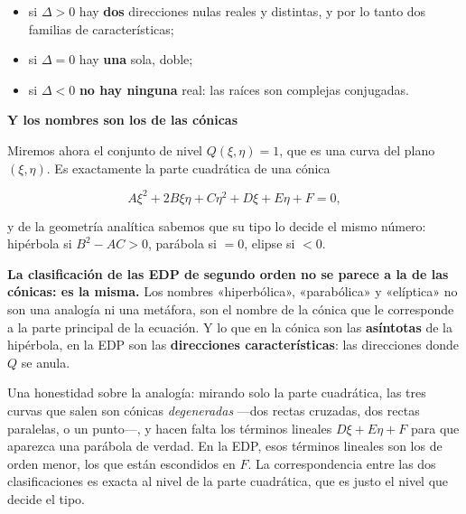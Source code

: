 \documentclass[
  spanish,
  a4paper,
]{scrbook}
\providecommand{\tightlist}{%
  \setlength{\itemsep}{0pt}\setlength{\parskip}{0pt}}
\theoremstyle{definition}
\theoremstyle{plain}
\theoremstyle{definition}
\theoremstyle{plain}
\theoremstyle{definition}
\theoremstyle{remark}
\begin{document}
\begin{itemize}
\tightlist
\item
  si \(\Delta > 0\) hay \textbf{dos} direcciones nulas reales y
  distintas, y por lo tanto dos familias de características;
\item
  si \(\Delta = 0\) hay \textbf{una} sola, doble;
\item
  si \(\Delta < 0\) \textbf{no hay ninguna} real: las raíces son
  complejas conjugadas.
\end{itemize}

\begin{tcolorbox}[enhanced jigsaw, arc=.35mm, bottomrule=.15mm, breakable, colback=white, colframe=quarto-callout-important-color-frame, left=2mm, leftrule=.75mm, opacityback=0, rightrule=.15mm, toprule=.15mm]
\begin{minipage}[t]{5.5mm}
\textcolor{quarto-callout-important-color}{\faExclamation}
\end{minipage}%
\begin{minipage}[t]{\textwidth - 5.5mm}

\vspace{-3mm}\textbf{Y los nombres son los de las cónicas}\vspace{3mm}

Miremos ahora el conjunto de nivel \(Q(\xi,\eta) = 1\), que es una curva
del plano \((\xi,\eta)\). Es exactamente la parte cuadrática de una
cónica

\[
A\xi^2 + 2B\xi\eta + C\eta^2 + D\xi + E\eta + F = 0 ,
\]

y de la geometría analítica sabemos que su tipo lo decide el mismo
número: hipérbola si \(B^2 - AC > 0\), parábola si \(=0\), elipse si
\(<0\).

\textbf{La clasificación de las EDP de segundo orden no se parece a la
de las cónicas: es la misma.} Los nombres «hiperbólica», «parabólica» y
«elíptica» no son una analogía ni una metáfora, son el nombre de la
cónica que le corresponde a la parte principal de la ecuación. Y lo que
en la cónica son las \textbf{asíntotas} de la hipérbola, en la EDP son
las \textbf{direcciones características}: las direcciones donde \(Q\) se
anula.

Una honestidad sobre la analogía: mirando solo la parte cuadrática, las
tres curvas que salen son cónicas \emph{degeneradas} ---dos rectas
cruzadas, dos rectas paralelas, o un punto---, y hacen falta los
términos lineales \(D\xi + E\eta + F\) para que aparezca una parábola de
verdad. En la EDP, esos términos lineales son los de orden menor, los
que están escondidos en \(F\). La correspondencia entre las dos
clasificaciones es exacta al nivel de la parte cuadrática, que es justo
el nivel que decide el tipo.

\end{minipage}%
\end{tcolorbox}
\end{document}
